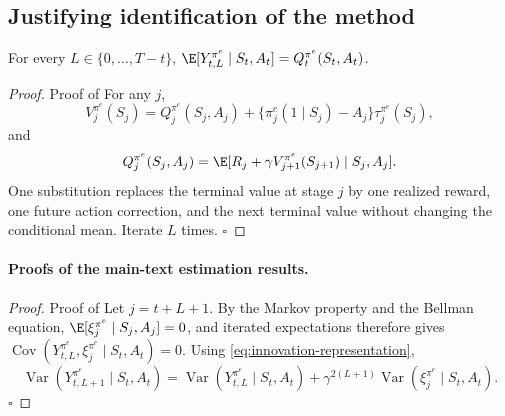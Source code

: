 \documentclass[opre,nonblindrev]{informs4}
\newcommand{\blipadv}{\tau}
\renewcommand{\qed}{\unskip\nobreak\hfill\ensuremath{\square}}
\begin{document}
\subsection{Justifying identification of the method}
\begin{proposition}
\label{prop:diff-equivalent-L-moments}
For every $L\in\{0,\ldots,T-t\}$,
$\E[Y_{t,L}^{\pi^e}\mid S_t,A_t]=Q_t^{\pi^e}(S_t,A_t)$.
\end{proposition}

\begin{proof}{Proof of }
For any $j$,
\[
V_j^{\pi^e}(S_j)
=
Q_j^{\pi^e}(S_j,A_j)
+
\{\pi_j^e(1\mid S_j)-A_j\}\blipadv_j^{\pi^e}(S_j),
\]
and
\[
Q_j^{\pi^e}(S_j,A_j)
=
\E[R_j+\gamma V_{j+1}^{\pi^e}(S_{j+1})\mid S_j,A_j].
\]
One substitution replaces the terminal value at stage $j$ by one realized
reward, one future action correction, and the next terminal value without
changing the conditional mean. Iterate $L$ times. \qed
\end{proof}

\paragraph{Proofs of the main-text estimation results.}

\begin{proof}{Proof of }
Let $j=t+L+1$. By the Markov property and the Bellman equation,
$\E[\xi_j^{\pi^e}\mid S_j,A_j]=0$, and iterated expectations therefore gives
$\operatorname{Cov}\!\left(Y_{t,L}^{\pi^e},\xi_j^{\pi^e}\mid S_t,A_t\right)=0$.
Using \cref{eq:innovation-representation},
\[
\operatorname{Var}\!\left(Y_{t,L+1}^{\pi^e}\mid S_t,A_t\right)
=\operatorname{Var}\!\left(Y_{t,L}^{\pi^e}\mid S_t,A_t\right)
+\gamma^{2(L+1)}\operatorname{Var}\!\left(\xi_j^{\pi^e}\mid S_t,A_t\right).
\]
\qed
\end{proof}
\end{document}
